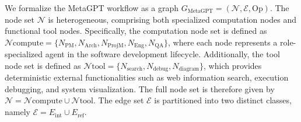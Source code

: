 We formalize the MetaGPT workflow as a graph $G_{\text{MetaGPT}} = (\mathcal{N}, \mathcal{E}, \mathrm{Op})$.
The node set $\mathcal{N}$ is heterogeneous, comprising both specialized computation nodes and functional tool nodes. Specifically, the computation node set is defined as $\mathcal{N}{\text{compute}} = \{N_{\text{PM}}, N_{\text{Arch}}, N_{\text{ProjM}}, N_{\text{Eng}}, N_{\text{QA}}\}$, where each node represents a role-specialized agent in the software development lifecycle. Additionally, the tool node set is defined as $\mathcal{N}{\text{tool}} = \{N_{\text{search}}, N_{\text{debug}}, N_{\text{diagram}}\}$, which provides deterministic external functionalities such as web information search, execution debugging, and system visualization. The full node set is therefore given by $\mathcal{N} = \mathcal{N}{\text{compute}} \cup \mathcal{N}{\text{tool}}$.
The edge set $\mathcal{E}$ is partitioned into two distinct classes, namely $\mathcal{E} = E_{\text{int}} \cup E_{\text{ref}}$.

